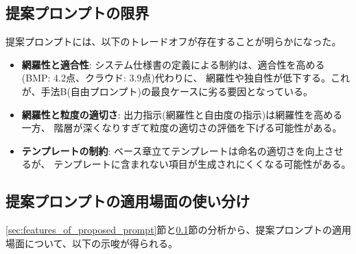 \subsection{提案プロンプトの限界}
\label{sec:limitations_of_proposed_prompt}

提案プロンプトには、以下のトレードオフが存在することが明らかになった。

\begin{itemize}
    \item \textbf{網羅性と適合性}: システム仕様書の定義による制約は、適合性を高める(BMP: 4.2点、クラウド: 3.9点)代わりに、
    網羅性や独自性が低下する。これが、手法B(自由プロンプト)の最良ケースに劣る要因となっている。
    
    \item \textbf{網羅性と粒度の適切さ}: 出力指示(網羅性と自由度の指示)は網羅性を高める一方、
    階層が深くなりすぎて粒度の適切さの評価を下げる可能性がある。
    
    \item \textbf{テンプレートの制約}: ベース章立てテンプレートは命名の適切さを向上させるが、
    テンプレートに含まれない項目が生成されにくくなる可能性がある。
\end{itemize}



\subsection{提案プロンプトの適用場面の使い分け}

\ref{sec:features_of_proposed_prompt}節と\ref{sec:limitations_of_proposed_prompt}節の分析から、提案プロンプトの適用場面について、以下の示唆が得られる。

